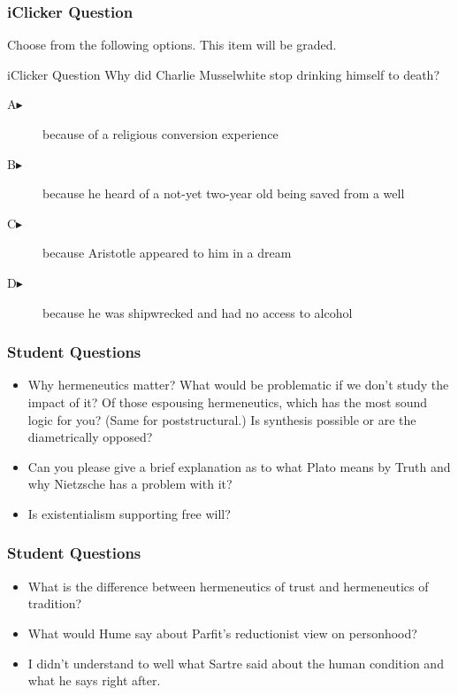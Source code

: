 \documentclass[xcolor=dvipsnames]{beamer}
\begin{document}
\begin{frame}
  \frametitle{iClicker Question}
Choose from the following options. This item will be graded.
\begin{block}{iClicker Question}
Why did Charlie Musselwhite stop drinking himself to death?
\end{block}
\begin{description}
\item[A\hspace{.2in}$\blacktriangleright$] because of a religious
  conversion experience
\item[B\hspace{.2in}$\blacktriangleright$] because he heard of a
  not-yet two-year old being saved from a well
\item[C\hspace{.2in}$\blacktriangleright$] because Aristotle
  appeared to him in a dream
\item[D\hspace{.2in}$\blacktriangleright$] because he was shipwrecked
  and had no access to alcohol
\end{description}
\end{frame}

\begin{frame}
  \frametitle{Student Questions}
  \begin{itemize}
  \item Why hermeneutics matter? What would be problematic if we don't
    study the impact of it? Of those espousing hermeneutics, which has
    the most sound logic for you? (Same for poststructural.) Is
    synthesis possible or are the diametrically opposed?
  \item Can you please give a brief explanation as to what Plato means
    by Truth and why Nietzsche has a problem with it?
  \item Is existentialism supporting free will?
  \end{itemize}
\end{frame}

\begin{frame}
  \frametitle{Student Questions}
  \begin{itemize}
  \item What is the difference between hermeneutics of trust and
    hermeneutics of tradition?
  \item What would Hume say about Parfit's reductionist view on
    personhood?
  \item I didn't understand to well what Sartre said about the human
    condition and what he says right after.
  \end{itemize}
\end{frame}
\end{document}
